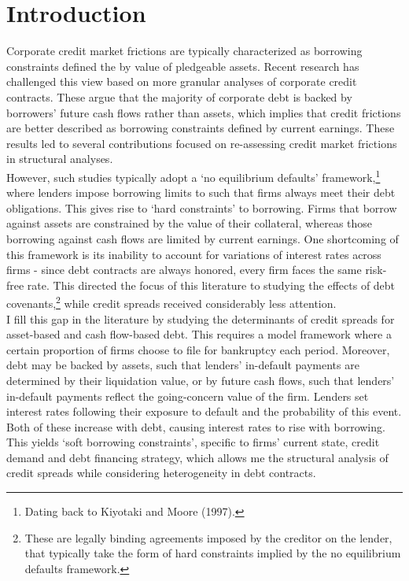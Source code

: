 \documentclass[12pt]{article}
\begin{document}
\section{Introduction \label{sec:introduction}} 
Corporate credit market frictions are typically characterized as borrowing constraints defined the by value of pledgeable assets. Recent research has challenged this view based on more granular analyses of corporate credit contracts. These argue that the majority of corporate debt is backed by borrowers’ future cash flows rather than assets, which implies that credit frictions are better described as borrowing constraints defined by current earnings. These results led to several contributions focused on re-assessing credit market frictions in structural analyses. \vspace{3mm} \\
However, such studies typically adopt a `no equilibrium defaults' framework,\footnote{Dating back to Kiyotaki and Moore (1997).} where lenders impose borrowing limits to such that firms always meet their debt obligations. This gives rise to `hard constraints' to borrowing. Firms that borrow against assets are constrained by the value of their collateral, whereas those borrowing against cash flows are limited by current earnings. One shortcoming of this framework is its inability to account for variations of interest rates across firms - since debt contracts are always honored, every firm faces the same risk-free rate. This directed the focus of this literature to studying the effects of debt covenants,\footnote{These are legally binding agreements imposed by the creditor on the lender, that typically take the form of hard constraints implied by the no equilibrium defaults framework.} while credit spreads received considerably less attention.  \vspace*{3mm} \\
I fill this gap in the literature by studying the determinants of credit spreads for asset-based and cash flow-based debt. This requires a model framework where a certain proportion of firms choose to file for bankruptcy each period. Moreover, debt may be backed by assets, such that lenders' in-default payments are determined by their liquidation value, or by future cash flows, such that lenders' in-default payments reflect the going-concern value of the firm. Lenders set interest rates following their exposure to default and the probability of this event. Both of these increase with debt, causing interest rates to rise with borrowing. This yields `soft borrowing constraints', specific to firms' current state, credit demand and debt financing strategy, which allows me the structural analysis of credit spreads while considering heterogeneity in debt contracts. \vspace*{3mm} \\
\end{document}

